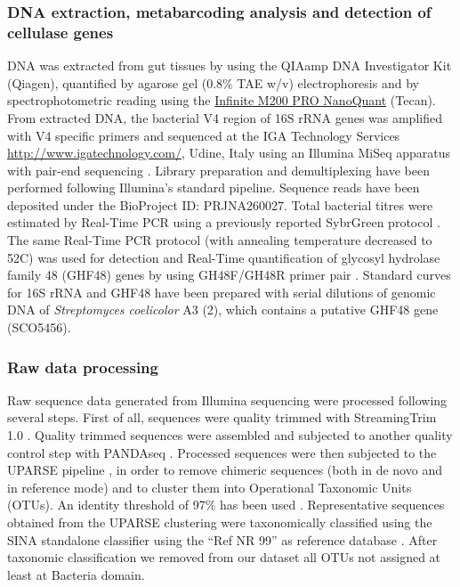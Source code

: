 \subsubsection{DNA extraction, metabarcoding analysis and detection of cellulase genes}
DNA was extracted from gut tissues by using the QIAamp DNA Investigator Kit (Qiagen), quantified by agarose gel (0.8\% TAE w/v) electrophoresis and by spectrophotometric reading using the \href{http://www.tecan.com/2.2398/Infinite-200-NanoQuant-Specifications}{ Infinite{\textregistered} M200 PRO NanoQuant} (Tecan). From extracted DNA, the bacterial V4 region of 16S rRNA genes was amplified with V4 specific primers \cite{schriml201315th} and sequenced at the IGA Technology Services \href{http://www.igatechnology.com/}{http://www\-.igatech\-nology\-.com/}, Udine, Italy using an Illumina MiSeq apparatus with pair-end sequencing \cite{caporaso2012ultra}. Library preparation and demultiplexing have been performed following Illumina's standard pipeline. Sequence reads have been deposited under  the BioProject ID: PRJNA260027. Total bacterial titres were estimated by Real-Time PCR using a previously reported SybrGreen protocol \cite{bacci2014composition}. The same Real-Time PCR protocol (with annealing temperature decreased to 52{\textdegree}C) was used for detection and Real-Time quantification of glycosyl hydrolase family 48 (GHF48) genes by using GH48F/GH48R primer pair \cite{izquierdo2010diversity}. Standard curves for 16S rRNA and GHF48 have been prepared with serial dilutions of genomic DNA of \textit{Streptomyces coelicolor} A3 (2), which contains a putative GHF48 gene (SCO5456).\\

\subsubsection{Raw data processing}
Raw sequence data generated from Illumina sequencing were processed following several steps. First of all, sequences were quality trimmed with StreamingTrim 1.0 \cite{bacci2014streamingtrim}. Quality trimmed sequences were assembled and subjected to another quality control step with PANDAseq \cite{masella2012pandaseq}. Processed sequences were then subjected to the UPARSE pipeline \cite{edgar2013uparse}, in order to remove chimeric sequences (both in de novo and in reference mode) and to cluster them into Operational Taxonomic Units (OTUs). An identity threshold of 97\% has been used \cite{konstantinidis2007prokaryotic}. Representative sequences obtained from the UPARSE clustering were taxonomically classified using the SINA standalone classifier using the ``Ref NR 99'' as reference database \cite{pruesse2012sina}. After taxonomic classification we removed from our dataset all OTUs not assigned at least at Bacteria domain.\\

